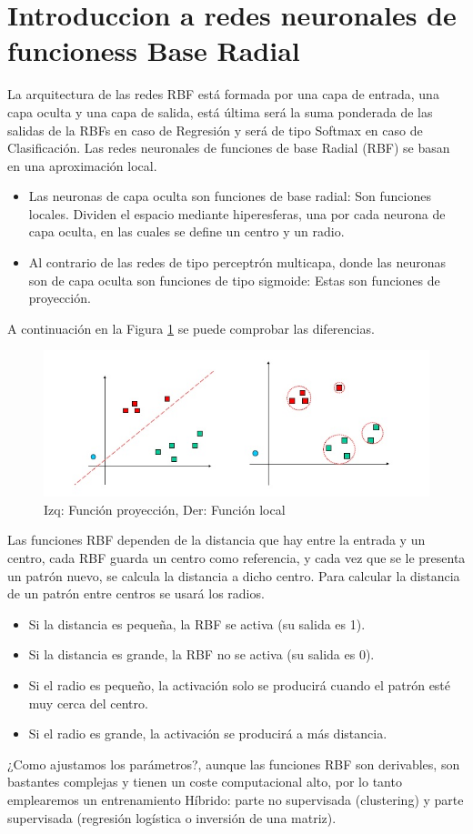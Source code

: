 \section{Introduccion a redes neuronales de funcioness Base Radial}

La arquitectura de las redes RBF está formada por una capa de entrada, una capa oculta y una capa de salida, está última será la suma ponderada de las salidas de la RBFs en caso de Regresión y será de tipo Softmax en caso de Clasificación. Las redes neuronales de funciones de base Radial (RBF) se basan en una aproximación local.
\begin{itemize}
\item Las neuronas de capa oculta son funciones de base radial: Son funciones locales. Dividen el espacio mediante hiperesferas, una por cada neurona de capa oculta, en las cuales se define un centro y un radio.
\item Al contrario de las redes de tipo perceptrón multicapa, donde las neuronas son de capa oculta son funciones de tipo sigmoide: Estas son funciones de proyección.
\end{itemize}
A continuación en la Figura \ref{fig:diferencias_funciones} se puede comprobar las diferencias.
\begin{figure}[ht]
\includegraphics[scale=1]{img/img1.jpg}
\caption{Izq: Función proyección, Der: Función local}
\label{fig:diferencias_funciones}
\end{figure}

Las funciones RBF dependen de la distancia que hay entre la entrada y un centro, cada RBF guarda un centro como referencia, y cada vez que se le presenta un patrón nuevo, se calcula la distancia a dicho centro. Para calcular la distancia de un patrón entre centros se usará los radios.
\begin{itemize}
	\item Si la distancia es pequeña, la RBF se activa (su salida es 1).
	\item Si la distancia es grande, la RBF no se activa (su salida es 0).
	\item Si el radio es pequeño, la activación solo se producirá cuando el patrón esté muy cerca del centro.
	\item Si el radio es grande, la activación se producirá a más distancia.
\end{itemize}

¿Como ajustamos los parámetros?, aunque las funciones RBF son derivables, son bastantes complejas y tienen un coste computacional alto, por lo tanto emplearemos un entrenamiento Híbrido: parte no supervisada (clustering) y parte supervisada (regresión logística o inversión de una matriz).

